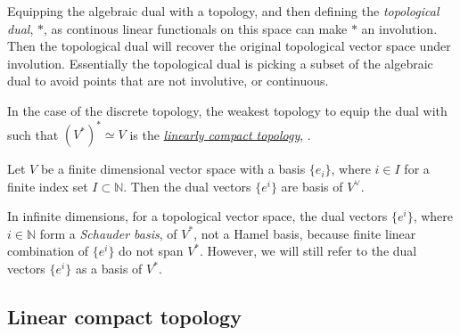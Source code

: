     
    
        
        Equipping the algebraic dual with a topology, and then defining the \emph{topological dual}, \( *\), as continous linear functionals on this space can make \(*\) an involution. Then the topological dual will recover the original topological vector space under involution. Essentially the topological dual is picking a subset of the algebraic dual to avoid points that are not involutive, or continuous.
        
        In the case of the discrete topology, the weakest topology to equip the dual with such that \( (V^*)^* \simeq V\) is the \hyperref[defn:lctop]{\emph{linearly compact topology}}, \cite{lefschetz1942algebraic, top_ent_local_lin_comp, finiteness_spaces_presheaves}.
        
        \begin{rem}
        Let \(V\) be a finite dimensional vector space with a basis \(\{ e_i\}\), where \( i \in I\) for a finite index set \( I \subset \mathbb{N}\). Then the dual vectors \( \{e^i\}\) are basis of \(V^{\vee}\).
        
        In infinite dimensions, for a topological vector space, the dual vectors \(\{e^i \}\), where \(i \in \mathbb{N}\) form a \emph{Schauder basis}, \cite{basis_vect} of \(V^*\), not a Hamel basis, because finite linear combination of \( \{e^i\}\) do not span \(V^*\). However, we will still refer to the dual vectors \(\{e^i\}\) as a basis of \(V^*\). 
        \end{rem}

        
        
        \subsection{Linear compact topology}
        

